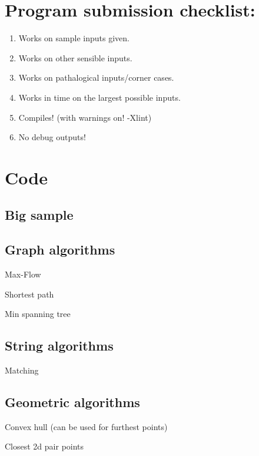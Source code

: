 \documentclass[10pt,a4paper]{article}
\newcommand{\codelisting}[1]{
  }
\begin{document}
\maketitle
\thispagestyle{myheadings}
\section*{Program submission checklist:}
\begin{enumerate}
\item Works on sample inputs given.
\item Works on other sensible inputs.
\item Works on pathalogical inputs/corner cases.
\item Works in time on the largest possible inputs.
\item Compiles! (with warnings on! -Xlint)
\item No debug outputs!
\end{enumerate}
\section*{Code}
\subsection*{Big sample}


\subsection*{Graph algorithms}
Max-Flow

Shortest path

Min spanning tree

\subsection*{String algorithms}
Matching
\codelisting{kmp.java}

\subsection{Geometric algorithms}
Convex hull (can be used for furthest points)

Closest 2d pair points
\end{document}

